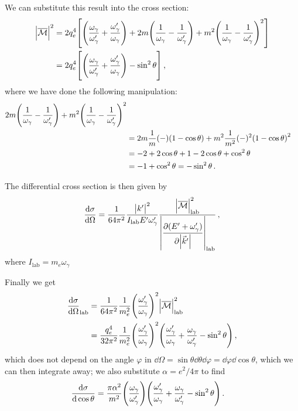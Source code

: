 \documentclass[main.tex]{subfiles}
\begin{document}
We can substitute this result into the cross section: 
%
\begin{align}
\abs{\mathcal{\overline{M}}}^2 
&= 2 q_e^{4}  \qty[
\qty(
    \frac{\omega_\gamma}{\omega_\gamma'} +
    \frac{\omega_\gamma'}{\omega_\gamma}
)
+ 2 m
\qty(
    \frac{1}{\omega_\gamma} -
    \frac{1}{\omega_\gamma '} 
)
+ m^{2} 
\qty(
    \frac{1}{\omega_\gamma} -
    \frac{1}{\omega_\gamma '} 
)^2  
]  \\
&= 2 q_e^{4} \qty[
\qty(
    \frac{\omega_\gamma}{\omega_\gamma'} +
    \frac{\omega_\gamma'}{\omega_\gamma}
)
-\sin^2\theta 
]
\,,
\end{align}
%
where we have done the following manipulation: 
%
\begin{align}
2 m
\qty(
    \frac{1}{\omega_\gamma} -
    \frac{1}{\omega_\gamma '} 
)
+ m^2
\qty(
    \frac{1}{\omega_\gamma} -
    \frac{1}{\omega_\gamma '} 
)^2  \\
&= 2m \frac{1}{m} (-) \qty(1 - \cos \theta )
+ m^2 \frac{1}{m^2} (-)^2 \qty(1 - \cos \theta )^2  \\
&= -2 + 2 \cos \theta + 1 - 2 \cos \theta + \cos^2 \theta   \\
&= - 1 + \cos^2\theta = -\sin^2\theta 
\,.
\end{align}

The differential cross section is then given by 
%
\begin{align}
\dv{\sigma }{\Omega } = \frac{1}{64 \pi^2} \frac{\abs{k'}^2}{I _{\text{lab}} E' \omega_{\gamma}'}
\frac{\abs{\mathcal{\overline{M}}}^2 _{\text{lab}}}{\displaystyle \abs{\pdv{(E' + \omega_{\gamma }')}{\abs{\vec{k}'}} }_{\text{lab}}}
\,,
\end{align}
%
where \(I _{\text{lab}} = m_e \omega_{\gamma }\)


Finally we get 
%
\begin{align}
\dv{\sigma }{\Omega } _{\text{lab}} &= \frac{1}{64 \pi^2} \frac{1}{m_e^2} \qty(\frac{\omega_{\gamma }'}{\omega_{\gamma }})^2 
\abs{\mathcal{\overline{M}}}^2 _{\text{lab}}  \\
&= \frac{q_e^{4}}{32 \pi^2} \frac{1}{m_e^2} \qty(\frac{\omega_{\gamma }'}{\omega_{\gamma }})^2 
\qty(\frac{\omega_{\gamma }'}{\omega_{\gamma }} + \frac{\omega_{\gamma }}{\omega_{\gamma }'} - \sin^2\theta )
\,,
\end{align}
%
which does not depend on the angle \(\varphi  \) in \(\dd{\Omega } = \sin \theta \dd{\theta } \dd{\varphi } = \dd{\varphi } \dd{\cos \theta }\), which we can then integrate away; we also substitute \(\alpha = e^2 / 4 \pi \) to find 
%
\begin{align}
\dv{\sigma }{\cos \theta } 
&= \frac{\pi \alpha^2}{m^2} \qty(\frac{\omega_{\gamma }}{\omega_{\gamma }'})
\qty(\frac{\omega_{\gamma }'}{\omega_{\gamma }} + \frac{\omega_{\gamma }}{\omega_{\gamma }'} - \sin^2\theta )
\,.
\end{align}
\end{document}
